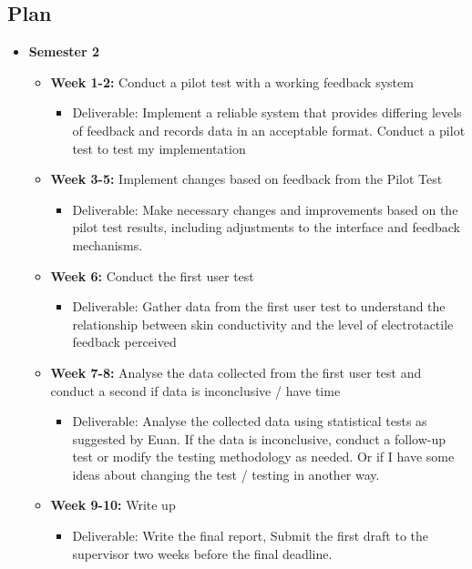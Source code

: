 \documentclass[11pt]{article}
\begin{document}
\subsection{Plan}\label{plan}
\begin{itemize}
    \item \textbf{Semester 2}
    \begin{itemize}
        \item \textbf{Week 1-2:} Conduct a pilot test with a working feedback system
        \begin{itemize}
            \item Deliverable: Implement a reliable system that provides differing levels of feedback and records data in an acceptable format. Conduct a pilot test to test my implementation
        \end{itemize}
        
        \item \textbf{Week 3-5:} Implement changes based on feedback from the Pilot Test
        \begin{itemize}
            \item Deliverable: Make necessary changes and improvements based on the pilot test results, including adjustments to the interface and feedback mechanisms.
        \end{itemize}
        
        \item \textbf{Week 6:} Conduct the first user test
        \begin{itemize}
            \item Deliverable: Gather data from the first user test to understand the relationship between skin conductivity and the level of electrotactile feedback perceived
        \end{itemize}
        
        \item \textbf{Week 7-8:} Analyse the data collected from the first user test and conduct a second if data is inconclusive / have time
        \begin{itemize}
            \item Deliverable: Analyse the collected data using statistical tests as suggested by Euan. If the data is inconclusive, conduct a follow-up test or modify the testing methodology as needed. Or if I have some ideas about changing the test / testing in another way.
        \end{itemize}
        
        \item \textbf{Week 9-10:} Write up
        \begin{itemize}
            \item Deliverable: Write the final report, Submit the first draft to the supervisor two weeks before the final deadline.
        \end{itemize}
    \end{itemize}
\end{itemize}

        
    
    
    
\end{document}
